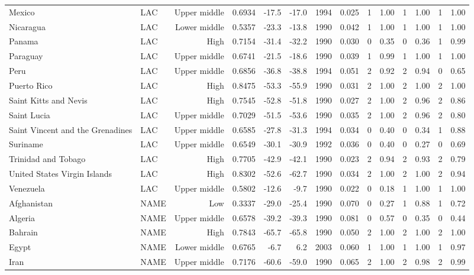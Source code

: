 \begin{longtable}{llrrrrrrrrrrrr}
Mexico & LAC & Upper middle & 0.6934 & -17.5 & -17.0 & 1994 & 0.025 & 1 & 1.00 & 1 & 1.00 & 1 & 1.00 \\
Nicaragua & LAC & Lower middle & 0.5357 & -23.3 & -13.8 & 1990 & 0.042 & 1 & 1.00 & 1 & 1.00 & 1 & 1.00 \\
Panama & LAC & High & 0.7154 & -31.4 & -32.2 & 1990 & 0.030 & 0 & 0.35 & 0 & 0.36 & 1 & 0.99 \\
Paraguay & LAC & Upper middle & 0.6741 & -21.5 & -18.6 & 1990 & 0.039 & 1 & 0.99 & 1 & 1.00 & 1 & 1.00 \\
Peru & LAC & Upper middle & 0.6856 & -36.8 & -38.8 & 1994 & 0.051 & 2 & 0.92 & 2 & 0.94 & 0 & 0.65 \\
Puerto Rico & LAC & High & 0.8475 & -53.3 & -55.9 & 1990 & 0.031 & 2 & 1.00 & 2 & 1.00 & 2 & 1.00 \\
Saint Kitts and Nevis & LAC & High & 0.7545 & -52.8 & -51.8 & 1990 & 0.027 & 2 & 1.00 & 2 & 0.96 & 2 & 0.86 \\
Saint Lucia & LAC & Upper middle & 0.7029 & -51.5 & -53.6 & 1990 & 0.035 & 2 & 1.00 & 2 & 0.96 & 2 & 0.80 \\
Saint Vincent and the Grenadines & LAC & Upper middle & 0.6585 & -27.8 & -31.3 & 1994 & 0.034 & 0 & 0.40 & 0 & 0.34 & 1 & 0.88 \\
Suriname & LAC & Upper middle & 0.6549 & -30.1 & -30.9 & 1992 & 0.036 & 0 & 0.40 & 0 & 0.27 & 0 & 0.69 \\
Trinidad and Tobago & LAC & High & 0.7705 & -42.9 & -42.1 & 1990 & 0.023 & 2 & 0.94 & 2 & 0.93 & 2 & 0.79 \\
United States Virgin Islands & LAC & High & 0.8302 & -52.6 & -62.7 & 1990 & 0.034 & 2 & 1.00 & 2 & 1.00 & 2 & 0.94 \\
Venezuela & LAC & Upper middle & 0.5802 & -12.6 &  -9.7 & 1990 & 0.022 & 0 & 0.18 & 1 & 1.00 & 1 & 1.00 \\
Afghanistan & NAME & Low & 0.3337 & -29.0 & -25.4 & 1990 & 0.070 & 0 & 0.27 & 1 & 0.88 & 1 & 0.72 \\
Algeria & NAME & Upper middle & 0.6578 & -39.2 & -39.3 & 1990 & 0.081 & 0 & 0.57 & 0 & 0.35 & 0 & 0.44 \\
Bahrain & NAME & High & 0.7843 & -65.7 & -65.8 & 1990 & 0.050 & 2 & 1.00 & 2 & 1.00 & 2 & 1.00 \\
Egypt & NAME & Lower middle & 0.6765 &  -6.7 &   6.2 & 2003 & 0.060 & 1 & 1.00 & 1 & 1.00 & 1 & 0.97 \\
Iran & NAME & Upper middle & 0.7176 & -60.6 & -59.0 & 1990 & 0.065 & 2 & 1.00 & 2 & 0.98 & 2 & 0.99 \\

\end{longtable}
